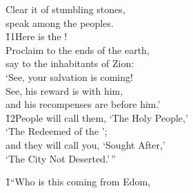 \begin{poetry}
\poemll    Clear it of stumbling stones, \\
\poemlll       speak among the peoples. \\
\poeml \v{11}Here is the ! \\
\poemll    Proclaim to the ends of the earth, \\
\poeml say to the inhabitants of Zion: \\
\poemll    `See, your salvation is coming! \\
\poeml See, his reward is with him, \\
\poemll    and his recompenses are before him.' \\
\poeml \v{12}People will call them, `The Holy People,' \\
\poemll    `The Redeemed of the '; \\
\poeml and they will call you, `Sought After,' \\
\poemll    `The City Not Deserted.'\,''
\end{poetry}

\v{1}``Who is this coming from Edom,

